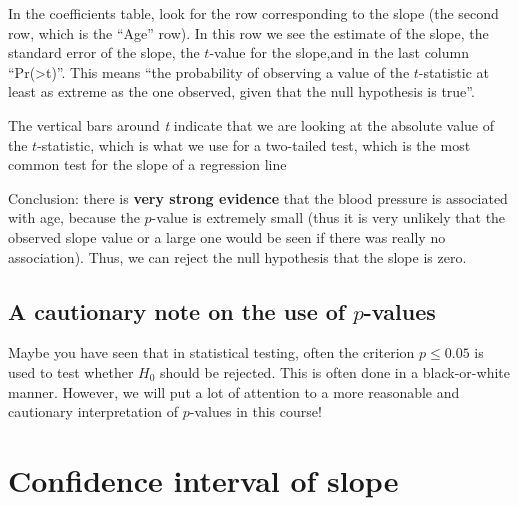 \documentclass[
  letterpaper,
  8pt,
  a4paper]{book}
\begin{document}
In the coefficients table, look for the row corresponding to the slope
(the second row, which is the ``Age'' row). In this row we see the
estimate of the slope, the standard error of the slope, the \(t\)-value
for the slope,and in the last column
``Pr(\textgreater\textbar t\textbar)''. This means ``the probability of
observing a value of the \(t\)-statistic at least as extreme as the one
observed, given that the null hypothesis is true''.

\begin{tcolorbox}[enhanced jigsaw, arc=.35mm, bottomrule=.15mm, bottomtitle=1mm, breakable, colback=white, colbacktitle=quarto-callout-note-color!10!white, colframe=quarto-callout-note-color-frame, coltitle=black, left=2mm, leftrule=.75mm, opacityback=0, opacitybacktitle=0.6, rightrule=.15mm, title=\textcolor{quarto-callout-note-color}{\faInfo}\hspace{0.5em}{Note}, titlerule=0mm, toprule=.15mm, toptitle=1mm]

The vertical bars around \emph{t} indicate that we are looking at the
absolute value of the \(t\)-statistic, which is what we use for a
two-tailed test, which is the most common test for the slope of a
regression line

\end{tcolorbox}

Conclusion: there is \textbf{very strong evidence} that the blood
pressure is associated with age, because the \(p\)-value is extremely
small (thus it is very unlikely that the observed slope value or a large
one would be seen if there was really no association). Thus, we can
reject the null hypothesis that the slope is zero.

\subsection*{\texorpdfstring{A cautionary note on the use of
\(p\)-values}{A cautionary note on the use of p-values}}\label{a-cautionary-note-on-the-use-of-p-values}

Maybe you have seen that in statistical testing, often the criterion
\(p\leq 0.05\) is used to test whether \(H_0\) should be rejected. This
is often done in a black-or-white manner. However, we will put a lot of
attention to a more reasonable and cautionary interpretation of
\(p\)-values in this course!

\section*{Confidence interval of
slope}\label{confidence-interval-of-slope}
\end{document}

